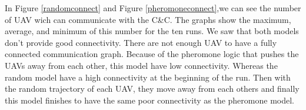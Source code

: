 In Figure \ref{randomconnect} and Figure \ref{pheromoneconnect},we can see the number of UAV wich can communicate with the C\&C.  The  graphs  show the maximum, average, and minimum of this number for the ten runs. We saw that both models don't provide good connectivity. There are not enough UAV to have a fully connected communication graph. Because of the pheromone logic that pushes the UAVs away from each other, this model have low connectivity. Whereas the random model have a high connectivity at the beginning of the run. Then with the random trajectory of each UAV, they move away from each others and finally this model finishes to have the same poor connectivity as the pheromone model.
